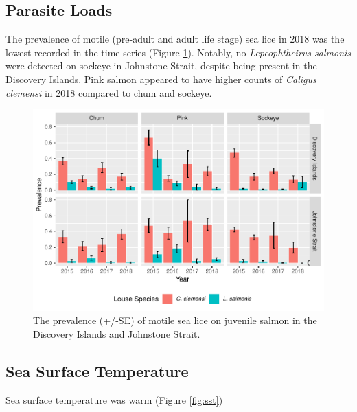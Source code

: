 \documentclass[fleqn,10pt]{wlpeerj} %
\begin{document}
\subsection*{Parasite Loads}\label{parasite-loads}

The prevalence of motile (pre-adult and adult life stage) sea lice in
2018 was the lowest recorded in the time-series (Figure
\ref{fig:sealice}). Notably, no \emph{Lepeophtheirus salmonis} were
detected on sockeye in Johnstone Strait, despite being present in the
Discovery Islands. Pink salmon appeared to have higher counts of
\emph{Caligus clemensi} in 2018 compared to chum and sockeye.

\begin{figure}
\includegraphics[width=0.8\linewidth]{peer_j_migration_dynamics_files/figure-latex/sealice-1} \caption{The prevalence (+/-SE) of motile sea lice on juvenile salmon in the Discovery Islands and Johnstone Strait.}\label{fig:sealice}
\end{figure}

\subsection*{Sea Surface Temperature}\label{sea-surface-temperature}

Sea surface temperature was warm (Figure \ref{fig:sst})
\end{document}
